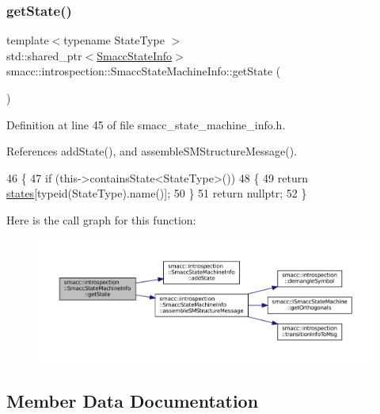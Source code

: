 \subsubsection{\texorpdfstring{get\+State()}{getState()}}
{\footnotesize\ttfamily template$<$typename State\+Type $>$ \\
std\+::shared\+\_\+ptr$<$\hyperlink{classsmacc_1_1introspection_1_1SmaccStateInfo}{Smacc\+State\+Info}$>$ smacc\+::introspection\+::\+Smacc\+State\+Machine\+Info\+::get\+State (\begin{DoxyParamCaption}{ }\end{DoxyParamCaption})\hspace{0.3cm}{\ttfamily [inline]}}



Definition at line 45 of file smacc\+\_\+state\+\_\+machine\+\_\+info.\+h.



References add\+State(), and assemble\+S\+M\+Structure\+Message().


\begin{DoxyCode}
46     \{
47         \textcolor{keywordflow}{if} (this->containsState<StateType>())
48         \{
49             \textcolor{keywordflow}{return} \hyperlink{classsmacc_1_1introspection_1_1SmaccStateMachineInfo_aef31d74ad3669f0b0f57fe0e008cd2f8}{states}[\textcolor{keyword}{typeid}(StateType).name()];
50         \}
51         \textcolor{keywordflow}{return} \textcolor{keyword}{nullptr};
52     \}
\end{DoxyCode}
Here is the call graph for this function\+:
\nopagebreak
\begin{figure}[H]
\begin{center}
\leavevmode
\includegraphics[width=350pt]{classsmacc_1_1introspection_1_1SmaccStateMachineInfo_ab2970707b3eec89f70aba88612ab0ca5_cgraph}
\end{center}
\end{figure}


\subsection{Member Data Documentation}
\mbox{\label{classsmacc_1_1introspection_1_1SmaccStateMachineInfo_a48e3ff7bbe2673d23e6942234446ebee}} 
